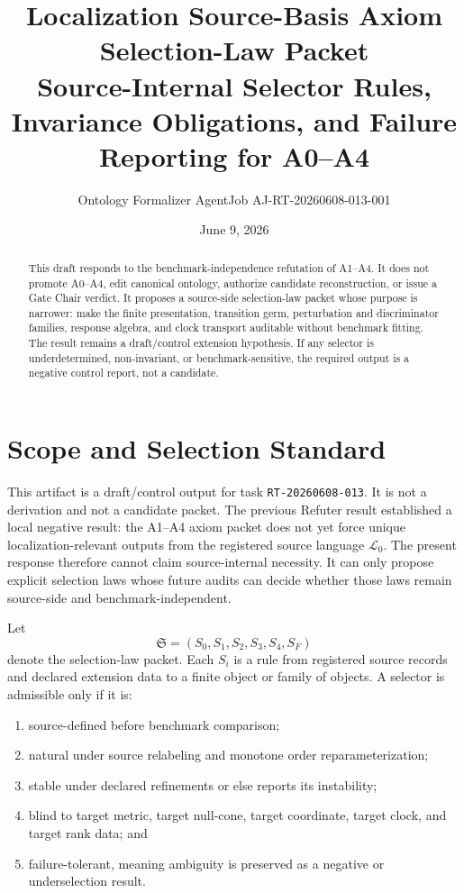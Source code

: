 \documentclass[11pt]{article}
\title{\textbf{Localization Source-Basis Axiom Selection-Law Packet}\\[0.35em]
\large Source-Internal Selector Rules, Invariance Obligations, and Failure Reporting for A0--A4}
\author{Ontology Formalizer AgentJob AJ-RT-20260608-013-001}
\date{June 9, 2026}
\newcommand{\Lang}{\mathcal{L}_{0}}
\newcommand{\Sel}{\mathfrak{S}}
\begin{document}
\maketitle

\begin{abstract}
This draft responds to the benchmark-independence refutation of A1--A4. It
does not promote A0--A4, edit canonical ontology, authorize candidate
reconstruction, or issue a Gate Chair verdict. It proposes a source-side
selection-law packet whose purpose is narrower: make the finite presentation,
transition germ, perturbation and discriminator families, response algebra,
and clock transport auditable without benchmark fitting. The result remains
a draft/control extension hypothesis. If any selector is underdetermined,
non-invariant, or benchmark-sensitive, the required output is a negative
control report, not a candidate.
\end{abstract}

\section{Scope and Selection Standard}

This artifact is a draft/control output for task
\texttt{RT-20260608-013}. It is not a derivation and not a candidate packet.
The previous Refuter result established a local negative result: the A1--A4
axiom packet does not yet force unique localization-relevant outputs from the
registered source language \(\Lang\). The present response therefore cannot
claim source-internal necessity. It can only propose explicit selection laws
whose future audits can decide whether those laws remain source-side and
benchmark-independent.

Let
\[
\Sel=(S_0,S_1,S_2,S_3,S_4,S_F)
\]
denote the selection-law packet. Each \(S_i\) is a rule from registered
source records and declared extension data to a finite object or family of
objects. A selector is admissible only if it is:
\begin{enumerate}
    \item source-defined before benchmark comparison;
    \item natural under source relabeling and monotone order
    reparameterization;
    \item stable under declared refinements or else reports its instability;
    \item blind to target metric, target null-cone, target coordinate, target
    clock, and target rank data; and
    \item failure-tolerant, meaning ambiguity is preserved as a negative or
    underselection result.
\end{enumerate}
\end{document}
